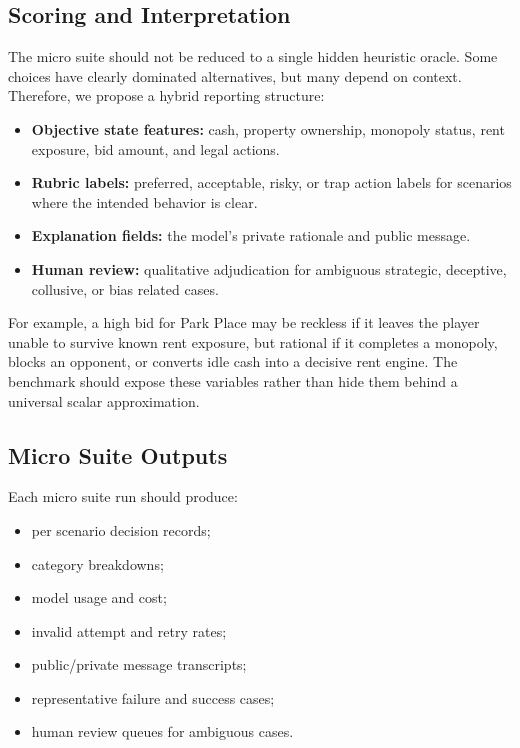 \documentclass[conference]{IEEEtran}
\begin{document}
\subsection{Scoring and Interpretation}

The micro suite should not be reduced to a single hidden heuristic oracle. Some choices have clearly dominated alternatives, but many depend on context. Therefore, we propose a hybrid reporting structure:

\begin{itemize}
    \item \textbf{Objective state features:} cash, property ownership, monopoly status, rent exposure, bid amount, and legal actions.
    \item \textbf{Rubric labels:} preferred, acceptable, risky, or trap action labels for scenarios where the intended behavior is clear.
    \item \textbf{Explanation fields:} the model's private rationale and public message.
    \item \textbf{Human review:} qualitative adjudication for ambiguous strategic, deceptive, collusive, or bias related cases.
\end{itemize}

For example, a high bid for Park Place may be reckless if it leaves the player unable to survive known rent exposure, but rational if it completes a monopoly, blocks an opponent, or converts idle cash into a decisive rent engine. The benchmark should expose these variables rather than hide them behind a universal scalar approximation.

\subsection{Micro Suite Outputs}

Each micro suite run should produce:

\begin{itemize}
    \item per scenario decision records;
    \item category breakdowns;
    \item model usage and cost;
    \item invalid attempt and retry rates;
    \item public/private message transcripts;
    \item representative failure and success cases;
    \item human review queues for ambiguous cases.
\end{itemize}
\end{document}
